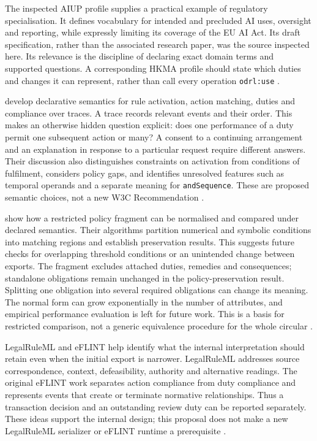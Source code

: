 The inspected AIUP profile supplies a practical example of regulatory
specialisation. It defines vocabulary for intended and precluded AI uses,
oversight and reporting, while expressly limiting its coverage of the EU AI
Act. Its draft specification, rather than the associated research paper, was
the source inspected here. Its relevance is the discipline of declaring exact
domain terms and supported questions. A corresponding HKMA profile should
state which duties and changes it can represent, rather than call every
operation \texttt{odrl:use} \citep{aiupprofile2024}.

\citet{bonattiodrl2025} develop declarative semantics for rule activation,
action matching, duties and compliance over traces. A trace records relevant
events and their order. This makes an otherwise hidden question explicit:
does one performance of a duty permit one subsequent action or many? A consent
to a continuing arrangement and an explanation in response to a particular
request require different answers. Their discussion also distinguishes
constraints on activation from conditions of fulfilment, considers policy gaps,
and identifies unresolved features such as temporal operands and a separate
meaning for \texttt{andSequence}. These are proposed semantic choices, not
a new W3C Recommendation
\citep[sec.~3, especially 3.6--3.8]{bonattiodrl2025}.

\citet{odrlnormalisation2026} show how a restricted policy fragment can be
normalised and compared under declared semantics. Their algorithms partition
numerical and symbolic conditions into matching regions and establish
preservation results. This suggests future checks for overlapping threshold
conditions or an unintended change between exports. The fragment excludes
attached duties, remedies and consequences; standalone obligations remain
unchanged in the policy-preservation result. Splitting one obligation into
several required obligations can change its meaning. The normal form can grow
exponentially in the number of attributes, and empirical performance evaluation
is left for future work. This is a basis for restricted comparison, not a
generic equivalence procedure for the whole circular
\citep[secs.~3--4, especially Theorem~6]{odrlnormalisation2026}.

LegalRuleML and eFLINT help identify what the internal interpretation should
retain even when the initial export is narrower. LegalRuleML addresses source
correspondence, context, defeasibility, authority and alternative readings.
The original eFLINT work separates action compliance from duty compliance
and represents events that create or terminate normative relationships.
Thus a transaction decision and an outstanding review duty can be reported
separately. These ideas support the internal design; this proposal does not
make a new LegalRuleML serializer or eFLINT runtime a prerequisite
\citep{legalruleml2021,eflint2020}.

